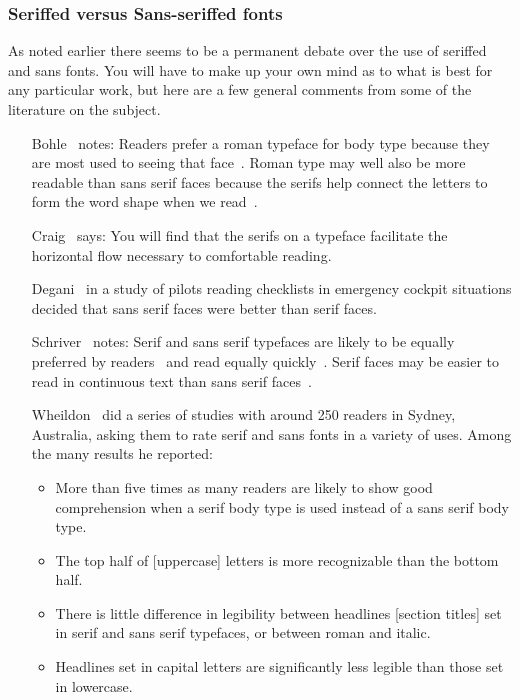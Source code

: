 \documentclass[10pt,letterpaper,extrafontsizes]{memoir}
\begin{document}
\subsubsection{Seriffed versus Sans-seriffed fonts}


    As noted earlier there seems to be a permanent debate over the use
of seriffed and sans fonts. You will have to make up your own mind as
to what is best for any particular work, but here are a few general
comments from some of the literature on the subject.

\begin{itemize}
\def\makelabel#1{\noindent #1}
\item[Bohle~\autocite{BOHLE90}] notes: Readers prefer a roman typeface for body
  type because they are most used to seeing that face~\autocite{REHE72}.
  Roman type may well also be more readable than sans serif faces because
  the serifs help connect the letters to form the word shape when
  we read~\autocite{REHE72}.

\item[Craig~\autocite{CRAIG92}] says: You will find that the serifs on a typeface
  facilitate the horizontal flow necessary to comfortable reading.

\item[Degani~\autocite{DEGANI92}] in a study of pilots reading checklists
  in emergency cockpit situations decided that sans serif faces were
  better than serif faces.

\item[Schriver~\autocite{SCHRIVER97}] notes: Serif and sans serif typefaces 
  are likely to be equally preferred by 
  readers~\autocite{HARTLEY83,TINKER63}
  and read equally quickly~\autocite{GOULD87,HARTLEY83,ZACHRISSOM69}.
  Serif faces may be easier to read in continuous text than sans
  serif faces~\autocite{BURT59,HVISTENDAHL75,ROBINSON71,WHEILDON95}.

\item[Wheildon~\autocite{WHEILDON95}] did a series of studies with around
250 readers in Sydney, Australia, asking them to rate serif and sans fonts
in a variety of uses. Among the many results he reported:
\begin{itemize}
  \item More than five times as many readers are likely to show good
  comprehension when a serif body type is used instead of a sans serif
  body type.
  \item The top half of [uppercase] letters is more recognizable than
  the bottom half.
  \item There is little difference in legibility between headlines
  [section titles] set in serif and sans serif typefaces, or between
  roman and italic.
  \item Headlines set in capital letters are significantly less legible
  than those set in lowercase.
\end{itemize}

\end{itemize}
\end{document}
